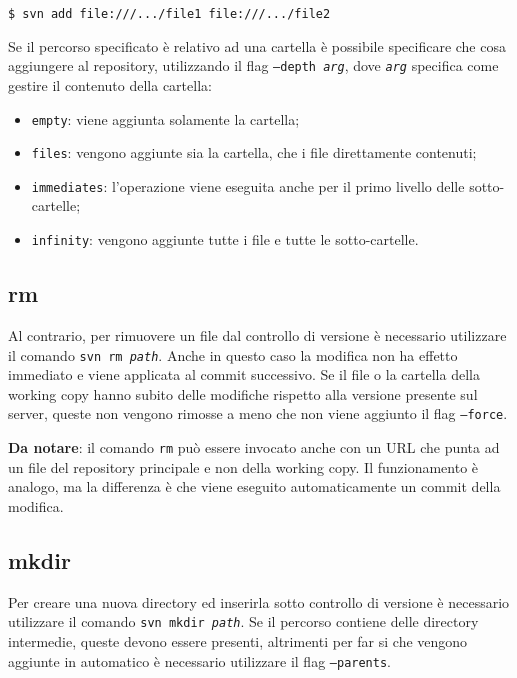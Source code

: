 \begin{lstlisting}
$ svn add file:///.../file1 file:///.../file2
\end{lstlisting}

Se il percorso specificato è relativo ad una cartella è possibile specificare che cosa aggiungere al repository, utilizzando il flag \texttt{--depth \textit{arg}}, dove \textit{\texttt{arg}} specifica come gestire il contenuto della cartella:

\begin{itemize}
	\item \texttt{empty}: viene aggiunta solamente la cartella;
	\item \texttt{files}: vengono aggiunte sia la cartella, che i file direttamente contenuti;  
	\item \texttt{immediates}: l'operazione viene eseguita anche per il primo livello delle sotto-cartelle;
	\item \texttt{infinity}: vengono aggiunte tutte i file e tutte le sotto-cartelle.
\end{itemize}



\subsection{rm}

Al contrario, per rimuovere un file dal controllo di versione è necessario utilizzare il comando \texttt{svn rm \textit{path}}. Anche in questo caso la modifica non ha effetto immediato e viene applicata al commit successivo. Se il file o la cartella della working copy hanno subito delle modifiche rispetto alla versione presente sul server, queste non vengono rimosse a meno che non viene aggiunto il flag \texttt{--force}.

\textbf{Da notare}: il comando \texttt{rm} può essere invocato anche con un URL che punta ad un file del repository principale e non della working copy. Il funzionamento è analogo, ma la differenza è che viene eseguito automaticamente un commit della modifica.

\subsection{mkdir}

Per creare una nuova directory ed inserirla sotto controllo di versione è necessario utilizzare il comando \texttt{svn mkdir \textit{path}}. Se il percorso contiene delle directory intermedie, queste devono essere presenti, altrimenti per far si che vengono aggiunte in automatico è necessario utilizzare il flag \texttt{--parents}.

